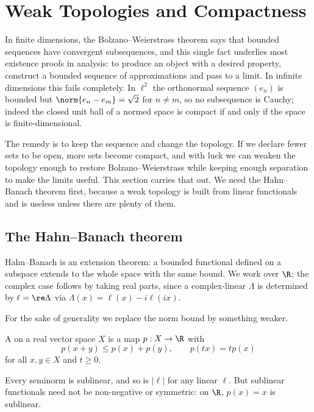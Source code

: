 \section{Weak Topologies and Compactness}\label{sec:weak}

In finite dimensions, the Bolzano--Weierstrass theorem says that bounded sequences have convergent subsequences, and this single fact underlies most existence proofs in analysis: to produce an object with a desired property, construct a bounded sequence of approximations and pass to a limit. In infinite dimensions this fails completely. In $\ell^2$ the orthonormal sequence $(e_n)$ is bounded but $\norm{e_n - e_m} = \sqrt 2$ for $n \ne m$, so no subsequence is Cauchy; indeed the closed unit ball of a normed space is compact if and only if the space is finite-dimensional.

The remedy is to keep the sequence and change the topology. If we declare fewer sets to be open, more sets become compact, and with luck we can weaken the topology enough to restore Bolzano--Weierstrass while keeping enough separation to make the limits useful. This section carries that out. We need the Hahn--Banach theorem first, because a weak topology is built from linear functionals and is useless unless there are plenty of them.

\subsection{The Hahn--Banach theorem}

Hahn--Banach is an extension theorem: a bounded functional defined on a subspace extends to the whole space with the same bound. We work over $\R$; the complex case follows by taking real parts, since a complex-linear $\Lambda$ is determined by $\ell = \re \Lambda$ via $\Lambda(x) = \ell(x) - i \ell(ix)$.

For the sake of generality we replace the norm bound by something weaker.

\begin{definition}
	A  on a real vector space $X$ is a map $p : X \to \R$ with
	$$p(x+y) \le p(x) + p(y), \qquad p(tx) = tp(x)$$
	for all $x,y \in X$ and $t \ge 0$.
\end{definition}

\begin{example}
	Every seminorm is sublinear, and so is $|\ell|$ for any linear $\ell$. But sublinear functionals need not be non-negative or symmetric: on $\R$, $p(x) = x$ is sublinear.
\end{example}

